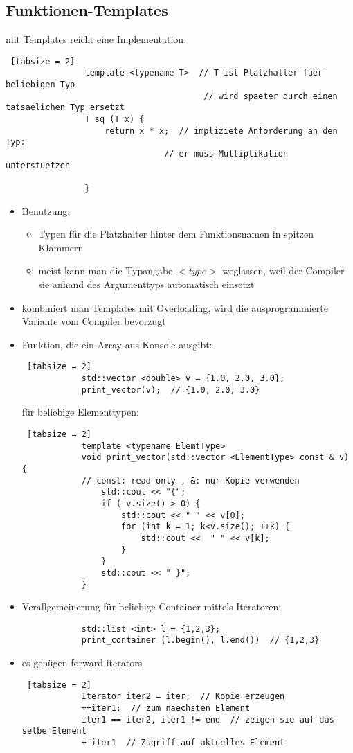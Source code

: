 \documentclass{article}
\begin{document}
	\subsection{Funktionen-Templates}
			mit Templates reicht eine Implementation:
			\begin{lstlisting} [tabsize = 2]
				template <typename T>  // T ist Platzhalter fuer beliebigen Typ
										// wird spaeter durch einen tatsaelichen Typ ersetzt
				T sq (T x) {
					return x * x;  // impliziete Anforderung an den Typ:
								// er muss Multiplikation unterstuetzen
					
				}
			\end{lstlisting}
	\begin{itemize}
		\item Benutzung:
		\begin{itemize}
			\item Typen für die Platzhalter hinter dem Funktionsnamen in spitzen Klammern
			\item meist kann man die Typangabe $<type>$ weglassen, weil der Compiler sie anhand des Argumenttyps automatisch einsetzt
		\end{itemize}
		\item kombiniert man Templates mit Overloading, wird die ausprogrammierte Variante vom Compiler bevorzugt
		\item Funktion, die ein Array aus Konsole ausgibt:
		\begin{lstlisting} [tabsize = 2]
			std::vector <double> v = {1.0, 2.0, 3.0};
			print_vector(v);  // {1.0, 2.0, 3.0}
		\end{lstlisting}
		für beliebige Elementtypen:
		\begin{lstlisting} [tabsize = 2]
			template <typename ElemtType>
			void print_vector(std::vector <ElementType> const & v) {
			// const: read-only , &: nur Kopie verwenden
				std::cout << "{";
				if ( v.size() > 0) {
					std::cout << " " << v[0];
					for (int k = 1; k<v.size(); ++k) {
						std::cout <<  " " << v[k];
					}
				}
				std::cout << " }";
			}
		\end{lstlisting}
		\item Verallgemeinerung für beliebige Container mittels Iteratoren:
		\begin{lstlisting}
			std::list <int> l = {1,2,3};
			print_container (l.begin(), l.end())  // {1,2,3}
		\end{lstlisting}
		\item es genügen forward iterators
		\begin{lstlisting} [tabsize = 2]
			Iterator iter2 = iter;  // Kopie erzeugen
			++iter1;  // zum naechsten Element
			iter1 == iter2, iter1 != end  // zeigen sie auf das selbe Element
			+ iter1  // Zugriff auf aktuelles Element
			

\end{lstlisting}
\end{itemize}
\end{document}
